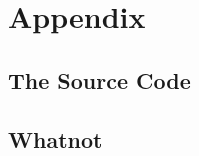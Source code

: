 \documentclass[12pt,a4paper]{article}
\theoremstyle{remark} \newtheorem*{termin}{Definition} %
\begin{document}
\section{Appendix}

\subsection{The Source Code}

\subsection{Whatnot}


\end{document}
